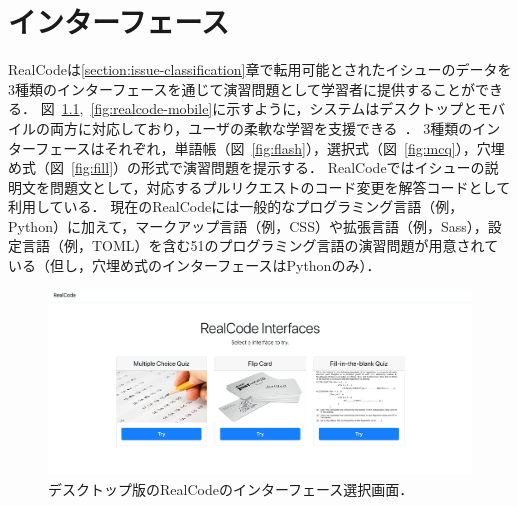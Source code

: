 \def\vector#1{\mbox{\boldmath $#1$}}

\chapter[インターフェース]{インターフェース}
\graphicspath{{Chapters_implementation/Figs/}}



RealCodeは\ref{section:issue-classification}章で転用可能とされたイシューのデータを3種類のインターフェースを通じて演習問題として学習者に提供することができる．
図~\ref{fig:interface-selector},~\ref{fig:realcode-mobile}に示すように，システムはデスクトップとモバイルの両方に対応しており，ユーザの柔軟な学習を支援できる~\cite{gassler2004integrated}．
3種類のインターフェースはそれぞれ，単語帳（図~\ref{fig:flash}），選択式（図~\ref{fig:mcq}），穴埋め式（図~\ref{fig:fill}）の形式で演習問題を提示する．
RealCodeではイシューの説明文を問題文として，対応するプルリクエストのコード変更を解答コードとして利用している．
現在のRealCodeには一般的なプログラミング言語（例，Python）に加えて，マークアップ言語（例，CSS）や拡張言語（例，Sass），設定言語（例，TOML）を含む51のプログラミング言語の演習問題が用意されている（但し，穴埋め式のインターフェースはPythonのみ）．

\begin{figure}[H]
	\centering
  \includegraphics[width=1.0\columnwidth]{20181228-realcode-interfaces-select.png}
  \caption{デスクトップ版のRealCodeのインターフェース選択画面．}
  \label{fig:interface-selector}
\end{figure}


